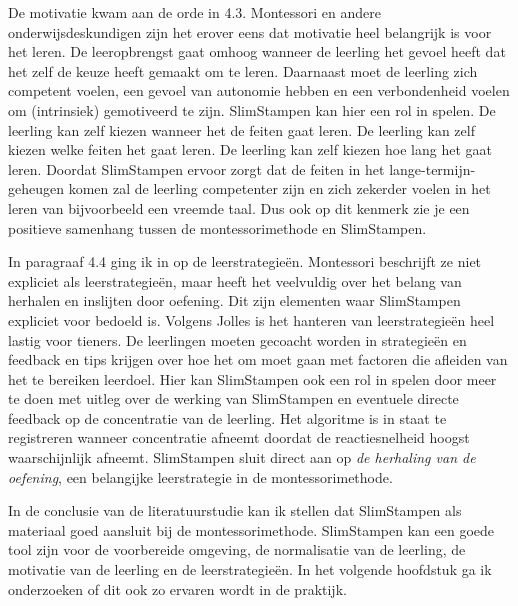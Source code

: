 \documentclass[12pt, a4paper]{article}
\begin{document}
De motivatie kwam aan de orde in 4.3. Montessori en andere onderwijsdeskundigen zijn het erover eens dat motivatie heel belangrijk is voor het leren. De leeropbrengst gaat omhoog wanneer de leerling het gevoel heeft dat het zelf de keuze heeft gemaakt om te leren. Daarnaast moet de leerling zich competent voelen, een gevoel van autonomie hebben en een verbondenheid voelen om (intrinsiek) gemotiveerd te zijn. SlimStampen kan hier een rol in spelen. De leerling kan zelf kiezen wanneer het de feiten gaat leren. De leerling kan zelf kiezen welke feiten het gaat leren. De leerling kan zelf kiezen hoe lang het gaat leren. Doordat SlimStampen ervoor zorgt dat de feiten in het lange-termijn-geheugen komen zal de leerling competenter zijn en zich zekerder voelen in het leren van bijvoorbeeld een vreemde taal. Dus ook op dit kenmerk zie je een positieve samenhang tussen de montessorimethode en SlimStampen.

In paragraaf 4.4 ging ik in op de leerstrategieën. Montessori beschrijft ze niet expliciet als leerstrategieën, maar heeft het veelvuldig over het belang van herhalen en inslijten door oefening. Dit zijn elementen waar SlimStampen expliciet voor bedoeld is. Volgens Jolles is het hanteren van leerstrategieën heel lastig voor tieners. De leerlingen moeten gecoacht worden in strategieën en feedback en tips krijgen over hoe het om moet gaan met factoren die afleiden van het te bereiken leerdoel. Hier kan SlimStampen ook een rol in spelen door meer te doen met uitleg over de werking van SlimStampen en eventuele directe feedback op de concentratie van de leerling. Het algoritme is in staat te registreren wanneer concentratie afneemt doordat de reactiesnelheid hoogst waarschijnlijk afneemt. SlimStampen sluit direct aan op \emph{de herhaling van de oefening}, een belangijke leerstrategie in de montessorimethode.

In de conclusie van de literatuurstudie kan ik stellen dat SlimStampen als materiaal goed aansluit bij de montessorimethode. SlimStampen kan een goede tool zijn voor de voorbereide omgeving, de normalisatie van de leerling, de motivatie van de leerling en de leerstrategieën. In het volgende hoofdstuk ga ik onderzoeken of dit ook zo ervaren wordt in de praktijk.
\newpage
\end{document}
